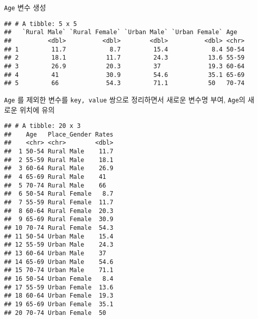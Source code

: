 \documentclass[
]{article}
\newenvironment{Shaded}{\begin{snugshade}}{\end{snugshade}}
\newcommand{\DataTypeTok}[1]{\textcolor[rgb]{0.13,0.29,0.53}{#1}}
\newcommand{\KeywordTok}[1]{\textcolor[rgb]{0.13,0.29,0.53}{\textbf{#1}}}
\newcommand{\NormalTok}[1]{#1}
\newcommand{\OperatorTok}[1]{\textcolor[rgb]{0.81,0.36,0.00}{\textbf{#1}}}
\newcommand{\StringTok}[1]{\textcolor[rgb]{0.31,0.60,0.02}{#1}}
\begin{document}
\texttt{Age} 변수 생성

\begin{Shaded}
\end{Shaded}

\begin{verbatim}
## # A tibble: 5 x 5
##   `Rural Male` `Rural Female` `Urban Male` `Urban Female` Age  
##          <dbl>          <dbl>        <dbl>          <dbl> <chr>
## 1         11.7            8.7         15.4            8.4 50-54
## 2         18.1           11.7         24.3           13.6 55-59
## 3         26.9           20.3         37             19.3 60-64
## 4         41             30.9         54.6           35.1 65-69
## 5         66             54.3         71.1           50   70-74
\end{verbatim}

\texttt{Age} 를 제외한 변수를 \texttt{key,\ value} 쌍으로 정리하면서
새로운 변수명 부여, \texttt{Age}의 새로운 위치에 유의

\begin{Shaded}
\end{Shaded}

\begin{verbatim}
## # A tibble: 20 x 3
##    Age   Place_Gender Rates
##    <chr> <chr>        <dbl>
##  1 50-54 Rural Male    11.7
##  2 55-59 Rural Male    18.1
##  3 60-64 Rural Male    26.9
##  4 65-69 Rural Male    41  
##  5 70-74 Rural Male    66  
##  6 50-54 Rural Female   8.7
##  7 55-59 Rural Female  11.7
##  8 60-64 Rural Female  20.3
##  9 65-69 Rural Female  30.9
## 10 70-74 Rural Female  54.3
## 11 50-54 Urban Male    15.4
## 12 55-59 Urban Male    24.3
## 13 60-64 Urban Male    37  
## 14 65-69 Urban Male    54.6
## 15 70-74 Urban Male    71.1
## 16 50-54 Urban Female   8.4
## 17 55-59 Urban Female  13.6
## 18 60-64 Urban Female  19.3
## 19 65-69 Urban Female  35.1
## 20 70-74 Urban Female  50
\end{verbatim}
\end{document}
